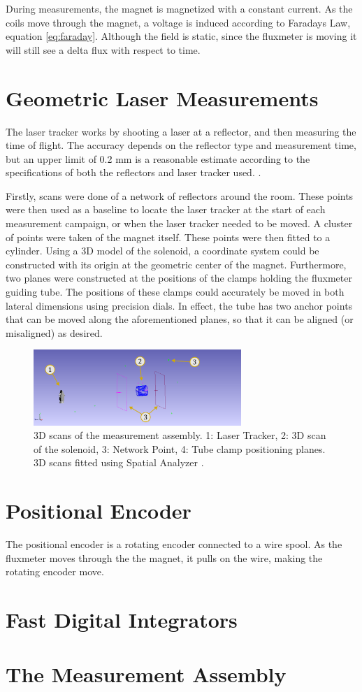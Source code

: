 During measurements, the magnet is magnetized with a constant current.
As the coils move through the magnet, a voltage is induced according 
to Faradays Law, equation \ref{eq:faraday}. Although the field is 
static, since the fluxmeter is moving it will still see a delta
flux with respect to time.

\section{Geometric Laser Measurements}
The laser tracker works by shooting a laser at a reflector, and then
measuring the time of flight. The accuracy depends on the reflector
type and measurement time, but an upper limit of 
0.2 mm is a reasonable estimate according to the
specifications of both the reflectors and laser tracker
used. \cite{leica_manual}. 

Firstly, scans were done of a network of reflectors around the 
room. These points were then used as a baseline to locate the
laser tracker at the start of each measurement campaign, or when
the laser tracker needed to be moved. A cluster of points were
taken of the magnet itself. These points
were then fitted to a cylinder. Using a 3D model of the
solenoid, a coordinate system could be constructed
with its origin at the geometric center of the magnet.
Furthermore, two planes were constructed at the positions
of the clamps holding the fluxmeter guiding tube. The 
positions of these clamps could accurately be moved in
both lateral dimensions using precision dials. In effect,
the tube has two anchor points that can be moved along
the aforementioned planes, so that it can be aligned (or misaligned)
as desired.

\begin{figure}[!h]
    \centering
    \includegraphics[width=0.7\textwidth]{figs/3Dscan}
    \caption{3D scans of the measurement assembly.
    1: Laser Tracker, 2: 3D scan of the solenoid, 
    3: Network Point, 4: Tube clamp positioning planes.
    3D scans fitted using Spatial Analyzer \cite{spatial_analyzer}.}
    \label{fig:3dscan}
\end{figure}

\section{Positional Encoder}
The positional encoder is a rotating encoder connected to a wire spool.
As the fluxmeter moves through the the magnet, it pulls on the wire,
making the rotating encoder move.
\section{Fast Digital Integrators}
\section{The Measurement Assembly}